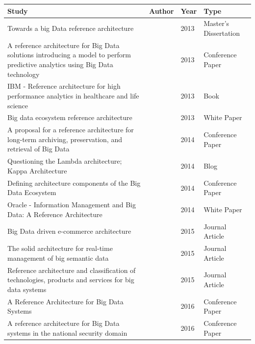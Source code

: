 \documentclass[review]{elsarticle}
\begin{document}
    \begin{longtable}{|p{5cm} | p{1cm}  | p{1cm} | p{3.4cm}|} 
     \hline
     Study  & Author & Year & Type \\ [0.5ex] 
     \hline
     Towards a big Data reference architecture  & \cite{Maier}& 2013 & Master's Dissertation \\ 
     \hline
     A reference architecture for Big Data solutions introducing a model to perform predictive analytics using Big Data technology  & \cite{geerdink2013reference}  & 2013 & Conference Paper \\
     \hline
     IBM - Reference architecture for high performance analytics in healthcare and life science  & \cite{quintero2019ibm} & 2013 & Book \\ [1ex] 
     \hline
     Big data ecosystem reference architecture  & 
     \cite{levin2013big} & 2013 & White Paper \\ [1ex] 
     \hline
     A proposal for a reference architecture for long-term archiving, preservation, and retrieval of Big Data  & \cite{viana2014proposal}  & 2014 & Conference Paper \\ 
     \hline
     Questioning the Lambda architecture; Kappa Architecture  & \cite{kreps2014questioning}  & 2014 & Blog \\
     \hline
     Defining architecture components of the Big Data Ecosystem  & \cite{demchenko2014defining} & 2014 & Conference Paper   \\ [1ex] 
     \hline
     Oracle - Information Management and Big Data: A Reference Architecture   & 
     \cite{cackett2013information} & 2014 & White Paper \\ [1ex] 
     \hline
     Big Data driven e-commerce architecture   & \cite{ghandour2015big} & 2015 & Journal Article \\ [1ex] 
     \hline
     The solid architecture for real-time management of big semantic data & \cite{martinez2015solid} & 2015 &  Journal Article \\ [1ex] 
     \hline
     Reference architecture and classification of technologies, products and services for big data systems  & \cite{paakkonen2015reference}  & 2015 & Journal Article \\ [1ex] 
     \hline
     A Reference Architecture for Big Data Systems  & \cite{sang2016reference}  & 2016 & Conference Paper  \\  
     \hline
     A reference architecture for Big Data systems in the national security domain  & \cite{klein2016reference}  & 2016 & Conference Paper \\ [1ex] 

\end{longtable}
\end{document}
